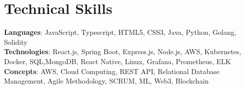 \section{Technical Skills}
    \begin{itemize}[leftmargin=0.15in, label={}]
	\small{\item{
		\textbf{Languages}{: JavaScript, Typescript, HTML5, CSS3, Java, Python, Golang, Solidity } \\
		\textbf{Technologies}{: React.js, Spring Boot, Express.js, Node.js, AWS, Kubernetes, Docker, SQL,MongoDB, React Native, Linux, Grafana, Prometheus, ELK} \\
		\textbf{Concepts}{: AWS, Cloud Computing, REST API, Relational Database Management, Agile Methodology, SCRUM, ML, Web3, Blockchain }
	}}
    \end{itemize}